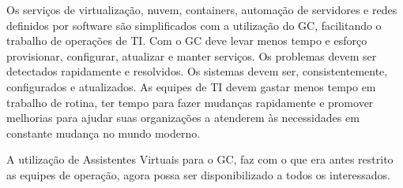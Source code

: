 \documentclass[quali]{mpit}
\begin{document}
Os serviços de virtualização, nuvem, containers, automação de servidores e  redes definidos por software são simplificados com a utilização do GC, facilitando o trabalho de operações de TI. Com o GC deve levar menos tempo e esforço  provisionar, configurar, atualizar e manter serviços. Os problemas devem ser detectados rapidamente e resolvidos. Os sistemas devem ser, consistentemente, configurados e atualizados. As equipes de TI devem gastar menos tempo em trabalho de rotina, ter tempo para fazer mudanças rapidamente e promover melhorias para ajudar suas organizações a atenderem às necessidades em constante mudança no mundo moderno.





A utilização de Assistentes Virtuais para o GC, faz com o que era antes restrito as equipes de operação, agora possa ser disponibilizado a todos os interessados.

\end{document}
